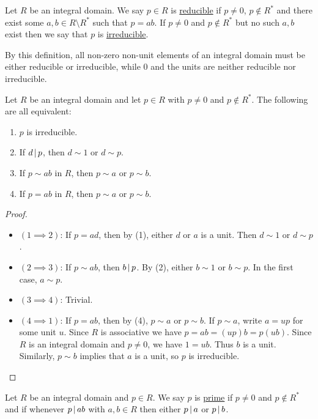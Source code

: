 \documentclass[11pt]{article}
\begin{document}
\begin{definition}[Reducibility]
    Let $R$ be an integral domain. We say $p\in R$ is \ul{reducible} if $p\neq0$, $p\not\in R^*$ and there exist some $a,b\in R\setminus R^*$ such that $p=ab$. If $p\neq0$ and $p\not\in R^*$ but no such $a,b$ exist then we say that $p$ is \ul{irreducible}.
\end{definition}

\begin{remark}
    By this definition, all non-zero non-unit elements of an integral domain must be either reducible or irreducible, while 0 and the units are neither reducible nor irreducible.
\end{remark}

\begin{proposition}
    Let $R$ be an integral domain and let $p\in R$ with $p\neq0$ and $p\not\in R^*$. The following are all equivalent:
    \begin{enumerate}
        \item $p$ is irreducible.
        \item If $d\,|\, p$, then $d\sim 1$ or $d\sim p$.
        \item If $p\sim ab$ in $R$, then $p\sim a$ or $p\sim b$.
        \item If $p=ab$ in $R$, then $p\sim a$ or $p\sim b$.
    \end{enumerate}
\end{proposition}

\begin{proof}\,
    \begin{itemize}
        \item$(1\implies 2)$: If $p=ad$, then by (1), either $d$ or $a$ is a unit. Then $d\sim 1$ or $d\sim p$.
        \item$(2\implies 3)$: If $p\sim ab$, then $b\,|\, p$. By (2), either $b\sim 1$ or $b\sim p$. In the first case, $a\sim p$.
        \item$(3\implies 4)$: Trivial.
        \item$(4\implies 1)$: If $p=ab$, then by (4), $p\sim a$ or $p\sim b$. If $p\sim a$, write $a=up$ for some unit $u$. Since $R$ is associative we have $p=ab=(up)b=p(ub)$. Since $R$ is an integral domain and $p\neq0$, we have $1=ub$. Thus $b$ is a unit. Similarly, $p\sim b$ implies that $a$ is a unit, so $p$ is irreducible.
    \end{itemize}
\end{proof}

\begin{definition}
    Let $R$ be an integral domain and $p\in R$. We say $p$ is \ul{prime} if $p\neq0$ and $p\not\in R^*$ and if whenever $p\,|\, ab$ with $a,b\in R$ then either $p\,|\, a$ or $p\,|\, b$.
\end{definition}
\end{document}
